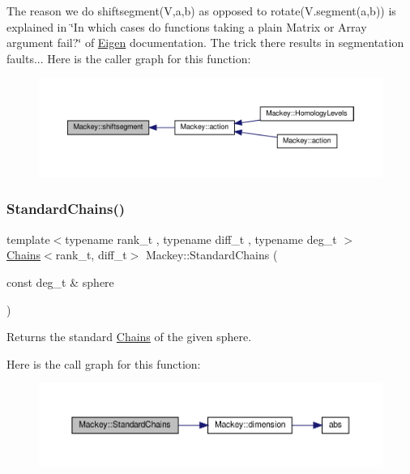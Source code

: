 The reason we do shiftsegment(\+V,a,b) as opposed to rotate(V.\+segment(a,b)) is explained in \char`\"{}\+In which cases do functions taking a plain Matrix or Array argument fail?\char`\"{} of \hyperlink{namespaceEigen}{Eigen} documentation. The trick there results in segmentation faults... Here is the caller graph for this function\+:\nopagebreak
\begin{figure}[H]
\begin{center}
\leavevmode
\includegraphics[width=350pt]{namespaceMackey_aab8a6292210a3b71960cb03b79d218e6_icgraph}
\end{center}
\end{figure}
\mbox{\label{namespaceMackey_a425b988266cedec0299fb539d99179b1}} 
\subsubsection{\texorpdfstring{Standard\+Chains()}{StandardChains()}\hspace{0.1cm}{\footnotesize\ttfamily [1/2]}}
{\footnotesize\ttfamily template$<$typename rank\+\_\+t , typename diff\+\_\+t , typename deg\+\_\+t $>$ \\
\hyperlink{classMackey_1_1Chains}{Chains}$<$rank\+\_\+t, diff\+\_\+t$>$ Mackey\+::\+Standard\+Chains (\begin{DoxyParamCaption}\item[{const deg\+\_\+t \&}]{sphere }\end{DoxyParamCaption})}



Returns the standard \hyperlink{classMackey_1_1Chains}{Chains} of the given sphere. 

Here is the call graph for this function\+:\nopagebreak
\begin{figure}[H]
\begin{center}
\leavevmode
\includegraphics[width=350pt]{namespaceMackey_a425b988266cedec0299fb539d99179b1_cgraph}
\end{center}
\end{figure}
\mbox{\label{namespaceMackey_aac9deeccbe291d1dd17df46a3d7c1f2b}} 
